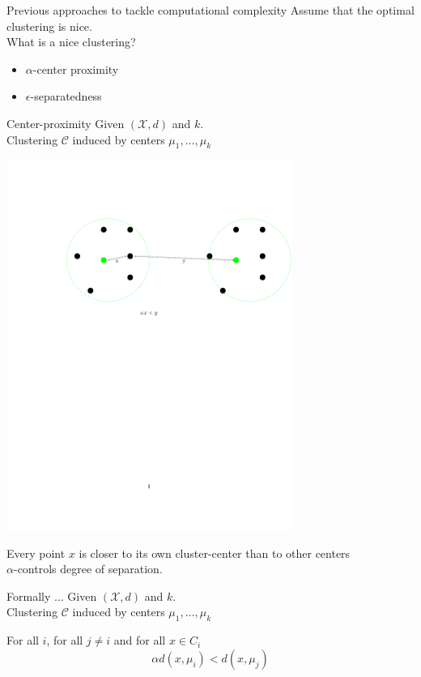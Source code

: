 \documentclass{beamer}
\newcommand{\mc}{\mathcal}
\begin{document}
\begin{frame}{Previous approaches to tackle computational complexity}
	Assume that the optimal clustering is {\color{green}nice}.\\
	\vspace{1.5cm}What is a nice clustering?
	\begin{itemize}
		\vspace{0.4cm}\item $\alpha$-center proximity
		\vspace{0.4cm}\item $\epsilon$-separatedness
	\end{itemize}
\end{frame}

\begin{frame}{Center-proximity}
	Given $(\mc X, d)$ and $k$.\\
	Clustering $\mc C$ induced by centers $\mu_1, \ldots, \mu_k$\\
	
	\begin{center}
	\includegraphics[trim={120 430 0 120},clip,width=0.7\textwidth]{figures/alphacp.pdf}
	\end{center}
	Every point $x$ is closer to its own cluster-center than to other centers\\
	$\alpha$-controls degree of separation.
\end{frame}

\begin{frame}{Formally $\ldots$}
	Given $(\mc X, d)$ and $k$.\\
	\vspace{0.4cm}Clustering $\mc C$ induced by centers $\mu_1, \ldots, \mu_k$\\
	
	\vspace{1cm}\begin{block}{}
		For all $i$, for all $j \neq i$ and for all $x \in C_i$
		$$\alpha d(x, \mu_i) < d(x, \mu_j)$$	
	\end{block}
\end{frame}
\end{document}
